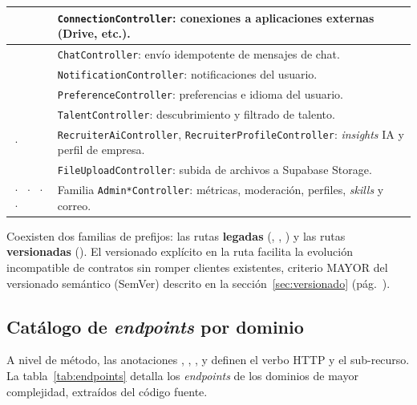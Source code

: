 \begin{tabularx}{\textwidth}{|L{4.5cm}|Y|}
\hline
{} & \texttt{ConnectionController}: conexiones a aplicaciones externas (Drive, etc.). \\
\hline
{}
 & \texttt{ChatController}: envío idempotente de mensajes de chat. \\
\hline
{} & \texttt{NotificationController}: notificaciones del usuario. \\
\hline
{}
 & \texttt{PreferenceController}: preferencias e idioma del usuario. \\
\hline
{} & \texttt{TalentController}: descubrimiento y filtrado de talento. \\
\hline
{}
 ·  & \texttt{RecruiterAiController}, \texttt{RecruiterProfileController}: \textit{insights} IA y perfil de empresa. \\
\hline
{} & \texttt{FileUploadController}: subida de archivos a Supabase Storage. \\
\hline
{}
 ·  ·  ·  ·  & Familia \texttt{Admin*Controller}: métricas, moderación, perfiles, \textit{skills} y correo. \\
\hline
\end{tabularx}
\label{tab:rutas-base}

\begin{NotaTecnica}
Coexisten dos familias de prefijos: las rutas \textbf{legadas} (,
, ) y las rutas \textbf{versionadas}
(). El versionado explícito en la ruta facilita la evolución
incompatible de contratos sin romper clientes existentes, criterio MAYOR del versionado
semántico (SemVer) descrito en la sección~\ref{sec:versionado} (pág.~\pageref{sec:versionado}).
\end{NotaTecnica}

\subsection{Catálogo de \textit{endpoints} por dominio}
\label{subsec:catalogo_endpoints}

A nivel de método, las anotaciones , ,
,  y  definen el
verbo HTTP y el sub-recurso. La tabla~\ref{tab:endpoints} detalla los \textit{endpoints}
de los dominios de mayor complejidad, extraídos del código fuente.

